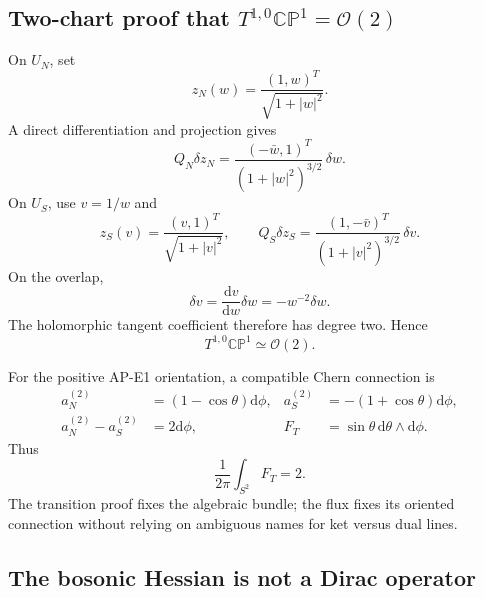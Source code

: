 \documentclass[11pt]{article}
\theoremstyle{definition}
\theoremstyle{remark}
\newcommand{\dd}{\mathrm d}
\newcommand{\CP}{\mathbb {CP}}
\newcommand{\cO}{\mathcal O}
\begin{document}
\subsection{Two-chart proof that \texorpdfstring{\(T^{1,0}\CP^1=\cO(2)\)}{T CP1=O(2)}}

On \(U_N\), set
\begin{equation}
 z_N(w)=\frac{(1,w)^T}{\sqrt{1+|w|^2}}.
 \label{eq:north-frame}
\end{equation}
A direct differentiation and projection gives
\begin{equation}
 Q_N\delta z_N
 =\frac{(-\bar w,1)^T}{(1+|w|^2)^{3/2}}\,\delta w.
 \label{eq:north-horizontal}
\end{equation}
On \(U_S\), use \(v=1/w\) and
\begin{equation}
 z_S(v)=\frac{(v,1)^T}{\sqrt{1+|v|^2}},
 \qquad
 Q_S\delta z_S
 =\frac{(1,-\bar v)^T}{(1+|v|^2)^{3/2}}\,\delta v.
 \label{eq:south-horizontal}
\end{equation}
On the overlap,
\begin{equation}
 \delta v=\frac{\dd v}{\dd w}\delta w=-w^{-2}\delta w.
 \label{eq:tangent-transition}
\end{equation}
The holomorphic tangent coefficient therefore has degree two.  Hence
\begin{equation}
 \boxed{T^{1,0}\CP^1\simeq\cO(2).}
 \label{eq:tangent-o2}
\end{equation}

For the positive AP-E1 orientation, a compatible Chern connection is
\begin{align}
 a_N^{(2)}&=(1-\cos\theta)\dd\phi,
 &a_S^{(2)}&=-(1+\cos\theta)\dd\phi,\label{eq:tangent-potentials}\\
 a_N^{(2)}-a_S^{(2)}&=2\dd\phi,
 &F_T&=\sin\theta\,\dd\theta\wedge\dd\phi.
 \label{eq:tangent-curvature}
\end{align}
Thus
\begin{equation}
 \frac1{2\pi}\int_{S^2}F_T=2.
 \label{eq:tangent-chern}
\end{equation}
The transition proof fixes the algebraic bundle; the flux fixes its oriented
connection without relying on ambiguous names for ket versus dual lines.

\subsection{The bosonic Hessian is not a Dirac operator}
\end{document}
